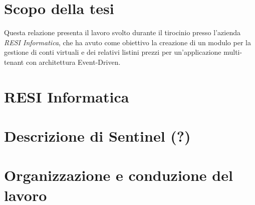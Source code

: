 \section{Scopo della tesi}
Questa relazione presenta il lavoro svolto durante il tirocinio presso l'azienda \textit{RESI Informatica}, che ha avuto come obiettivo la creazione di un modulo per la
gestione di conti virtuali e dei relativi listini prezzi per un'applicazione multi-tenant con architettura Event-Driven.

\section{RESI Informatica}

\section{Descrizione di Sentinel (?)}


\section{Organizzazione e conduzione del lavoro}

